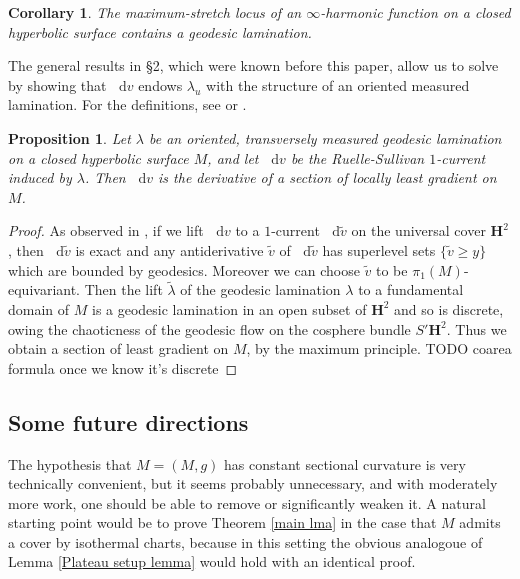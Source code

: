 \documentclass[reqno,10pt]{amsart}
\newcommand{\Hyp}{\mathbf H}
\newcommand*\dif{\mathop{}\!\mathrm{d}}
\newtheorem{proposition}[theorem]{Proposition}
\newtheorem{corollary}[theorem]{Corollary}
\theoremstyle{definition}
\numberwithin{equation}{section}
\begin{document}
\begin{corollary}\label{maximum stretch contains lamination}
The maximum-stretch locus of an $\infty$-harmonic function on a closed hyperbolic surface contains a geodesic lamination.
\end{corollary}

The general results in \S2, which were known before this paper, allow us to solve \cite[Problem 9.7]{daskalopoulos2020transverse} by showing that $\dif v$ endows $\lambda_u$ with the structure of an oriented measured lamination.
For the definitions, see \cite[\S8]{daskalopoulos2020transverse} or \cite{Ruelle75}.

\begin{proposition}\label{ruelle sullivan antiderivative}
Let $\lambda$ be an oriented, transversely measured geodesic lamination on a closed hyperbolic surface $M$, and let $\dif v$ be the Ruelle-Sullivan $1$-current induced by $\lambda$.
Then $\dif v$ is the derivative of a section of locally least gradient on $M$.
\end{proposition}
\begin{proof}
As observed in \cite[\S9]{daskalopoulos2020transverse}, if we lift $\dif v$ to a $1$-current $\dif \tilde v$ on the universal cover $\Hyp^2$, then $\dif \tilde v$ is exact and any antiderivative $\tilde v$ of $\dif \tilde v$ has superlevel sets $\{\tilde v \geq y\}$ which are bounded by geodesics.
Moreover we can choose $\tilde v$ to be $\pi_1(M)$-equivariant.
Then the lift $\tilde \lambda$ of the geodesic lamination $\lambda$ to a fundamental domain of $M$ is a geodesic lamination in an open subset of $\Hyp^2$ and so is discrete, owing the chaoticness of the geodesic flow on the cosphere bundle $S'\Hyp^2$.
Thus we obtain a section of least gradient on $M$, by the maximum principle. TODO coarea formula once we know it's discrete
\end{proof}

\subsection{Some future directions}\label{open problems}
The hypothesis that $M = (M, g)$ has constant sectional curvature is very technically convenient, but it seems probably unnecessary, and with moderately more work, one should be able to remove or significantly weaken it.
A natural starting point would be to prove Theorem \ref{main lma} in the case that $M$ admits a cover by isothermal charts, because in this setting the obvious analogoue of Lemma \ref{Plateau setup lemma} would hold with an identical proof.
\end{document}
